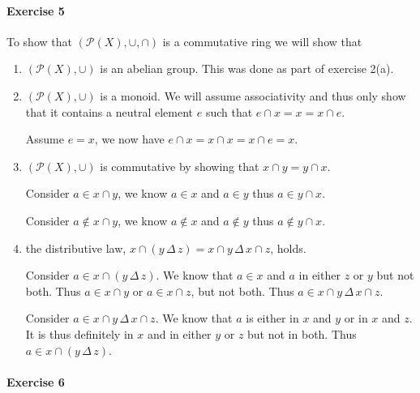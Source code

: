 \documentclass{article}
\newcommand{\Deltaop}{\, \Delta\, }
\begin{document}
\pagebreak
\paragraph{Exercise 5}

To show that $(\mathcal{P}(X), \cup, \cap)$ is a commutative ring we will show that
\begin{enumerate}
    \item $(\mathcal{P}(X), \cup)$ is an abelian group. This was done as part of exercise 2(a).
    
    \item $(\mathcal{P}(X), \cup)$ is a monoid. We will assume associativity and thus only show that it contains a neutral element $e$ such that $e \cap x = x = x \cap e$.
    
    Assume $e = x$, we now have $e \cap x = x \cap x = x \cap e = x$.
    
    \item $(\mathcal{P}(X), \cup)$ is commutative by showing that $x \cap y = y \cap x$.
    
    Consider $a \in x \cap y$, we know $a \in x$ and $a \in y$ thus $a \in y \cap x$.
    
    Consider $a \not\in x \cap y$, we know $a \not\in x$ and $a \not\in y$ thus $a \not\in y \cap x$.
    
    \item the distributive law, $x \cap (y \Deltaop z) = x \cap y \Deltaop x \cap z$, holds.
    
    Consider $a \in x \cap (y \Deltaop z)$. We know that $a \in x$ and $a$ in either $z$ or $y$ but not both. Thus $a \in x \cap y$ or $a \in x \cap z$, but not both. Thus $a \in x \cap y \Deltaop x \cap z$.

    Consider $a \in x \cap y \Deltaop x \cap z$. We know that $a$ is either in $x$ and $y$ or in $x$ and $z$. It is thus definitely in $x$ and in either $y$ or $z$ but not in both. Thus $a \in x \cap (y \Deltaop z)$.
\end{enumerate}

\pagebreak
\paragraph{Exercise 6}
\end{document}
